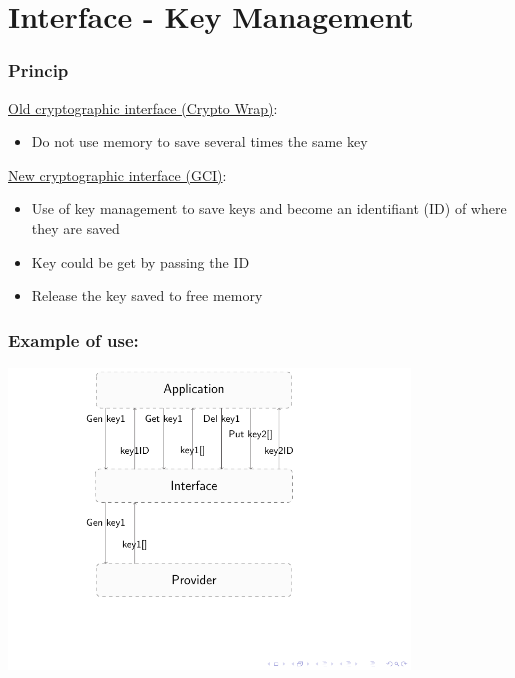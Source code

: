 \section{Interface - Key Management}


\begin{frame}

\frametitle{Princip}

\underline{Old cryptographic interface (Crypto Wrap)}:
\begin{itemize}
	\item Do not use memory to save several times the same key
\end{itemize}

\vspace{0.25cm}

\underline{New cryptographic interface (GCI)}:

\begin{itemize}
  \item Use of key management to save keys and become an identifiant (ID) of
  where they are saved
  \item Key could be get by passing the ID
  \item Release the key saved to free memory
\end{itemize}

\end{frame}



\begin{frame}

\frametitle{Example of use:}


\includegraphics[trim=0.5cm 1cm 14cm 0cm, height=8cm]{figures/key_manag.pdf}


\end{frame}
